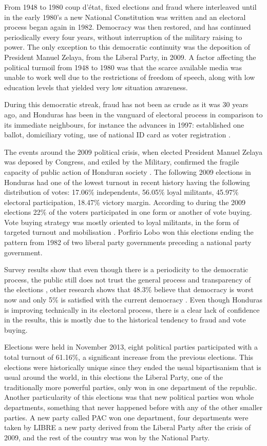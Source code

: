 \documentclass[letterpaper,10pt]{article}
\begin{document}
From 1948 to 1980 coup d'\'{e}tat, fixed elections and fraud where interleaved until in the early 1980's a new National Constitution was written and an electoral process began again in 1982. Democracy was then restored, and has continued periodically every four years, without interruption of the military raising to power. The only exception to this democratic continuity was the deposition of President Manuel Zelaya, from the Liberal Party, in 2009. A factor affecting the political turmoil from 1948 to 1980 was that the scarce available media was unable to work well due to the restrictions of freedom of speech, along with low education levels that yielded very low situation awareness.

During this democratic streak, fraud has not been as crude as it was 30 years ago, and Honduras has been in the vanguard of electoral process in comparison to its immediate neighbours, for instance the advances in 1997: established one ballot, domiciliary voting, use of national ID card as voter registration \citep{romero2014}.

The events around the 2009 political crisis, when elected President Manuel Zelaya was deposed by Congress, and exiled by the Military, confirmed the fragile capacity of public action of Honduran society \citep{romero2014}. The following 2009 elections in Honduras had one of the lowest turnout in recent history having the following distribution of votes: 17.06\% independents, 56.05\% loyal militants, 45.97\% electoral participation, 18.47\% victory margin. According to \cite{gonza2014} during the 2009 elections 22\% of the voters participated in one form or another of vote buying. Vote buying strategy was mostly oriented to loyal militants, in the form of targeted turnout and mobilisation \citep{gonza2014}. Porfirio Lobo won this elections ending the pattern from 1982 of two liberal party governments preceding a national party government.

Survey results show that even though there is a periodicity to the democratic process, the public still does not trust the general process and transparency of the elections \citep{romero2014}, other research shows that 48.3\% believe that democracy is worst now and only 5\% is satisfied with the current democracy \citep{latinbar}. Even though Honduras is improving technically in its electoral process, there is a clear lack of confidence in the results, this is mostly due to the historical tendency to fraud and vote buying.

Elections were held in November 2013, eight political parties participated with a total turnout of 61.16\%, a significant increase from the previous elections. This elections were historically unique since they ended the usual bipartisanism that is usual around the world, in this elections the Liberal Party, one of the traditionally more powerful parties, only won in one department of the republic. Another particularity of this elections was that new political parties won whole departments, something that never happened before with any of the other smaller parties. A new party called PAC won one department, four departments were taken by LIBRE a new party derived from the Liberal Party after the crisis of 2009, and the rest of the country was won by the National Party.
\end{document}
